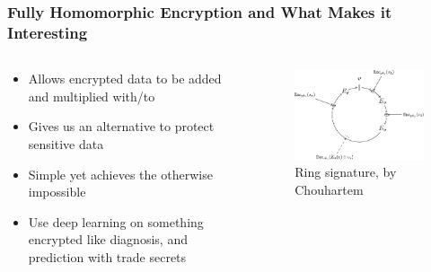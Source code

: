 \documentclass[aspectratio=169]{beamer}
\begin{document}
  \begin{frame}
    \frametitle{Fully Homomorphic Encryption and What Makes it Interesting}
    \begin{columns}
      \begin{column}{0.5\textwidth}
        \begin{itemize}
          \item Allows encrypted data to be added and multiplied with/to
          \item Gives us an alternative to protect sensitive data
          \item Simple yet achieves the otherwise impossible
          \item Use deep learning on something encrypted like diagnosis, and prediction with trade secrets
        \end{itemize}
      \end{column}
      \begin{column}{0.5\textwidth}
        \begin{figure}[th!]
          \centering
          \includegraphics[width=1\textwidth]{ring-signature.pdf}
          \caption{Ring signature, by Chouhartem}
          \label{fig:jim_carrey}
        \end{figure}
      \end{column}
    \end{columns}
  \end{frame}
\end{document}
